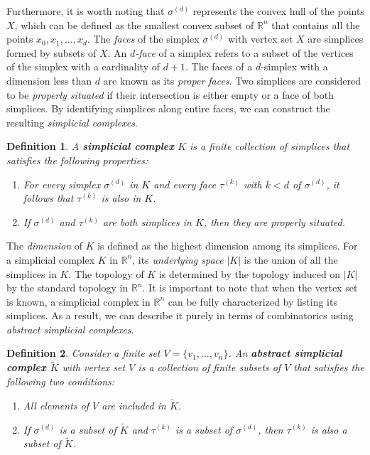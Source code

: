 \documentclass{amsart}
\newtheorem{definition}{Definition}[section]
\begin{document}
Furthermore, it is worth noting that $\sigma^{(d)}$ represents the convex hull of the points $X$, which can be defined as the smallest convex subset of $\mathbb{R}^n$ that contains all the points $x_0, x_1, \ldots, x_d$. The \emph{faces} of the simplex $\sigma^{(d)}$ with vertex set $X$ are simplices formed by subsets of $X$. An \emph{$d$-face} of a simplex refers to a subset of the vertices of the simplex with a cardinality of $d+1$. The faces of a $d$-simplex with a dimension less than $d$ are known as its \emph{proper faces}. Two simplices are considered to be \emph{properly situated} if their intersection is either empty or a face of both simplices. By identifying simplices along entire faces, we can construct the resulting \emph{simplicial complexes}.

\begin{definition}
A \textbf{simplicial complex} $K$ is a finite collection of simplices that satisfies the following properties:
\begin{enumerate}
	\item For every simplex $\sigma^{(d)}$ in $K$ and every face $\tau^{(k)}$ with $k < d$ of $\sigma^{(d)}$, it follows that $\tau^{(k)}$ is also in $K$.
	\item If $\sigma^{(d)}$ and $\tau^{(k)}$ are both simplices in $K$, then they are properly situated.
\end{enumerate}
\end{definition}

The \emph{dimension} of $K$ is defined as the highest dimension among its simplices. For a simplicial complex $K$ in $\mathbb{R}^n$, its \emph{underlying space} $\vert K \vert$ is the union of all the simplices in $K$. The topology of $K$ is determined by the topology induced on $\vert K \vert$ by the standard topology in $\mathbb{R}^n$. It is important to note that when the vertex set is known, a simplicial complex in $\mathbb{R}^n$ can be fully characterized by listing its simplices. As a result, we can describe it purely in terms of combinatorics using \emph{abstract simplicial complexes}.

\begin{definition}
Consider a finite set $V = \{v_1, \ldots, v_n\}$. An \textbf{abstract simplicial complex $\tilde{K}$} with vertex set $V$ is a collection of finite subsets of $V$ that satisfies the following two conditions:
\begin{enumerate}
	\item All elements of $V$ are included in $\tilde{K}$.
	\item If $\sigma^{(d)}$ is a subset of $\tilde{K}$ and $\tau^{(k)}$ is a subset of $\sigma^{(d)}$, then $\tau^{(k)}$ is also a subset of $\tilde{K}$.
\end{enumerate}
\end{definition}
\end{document}
